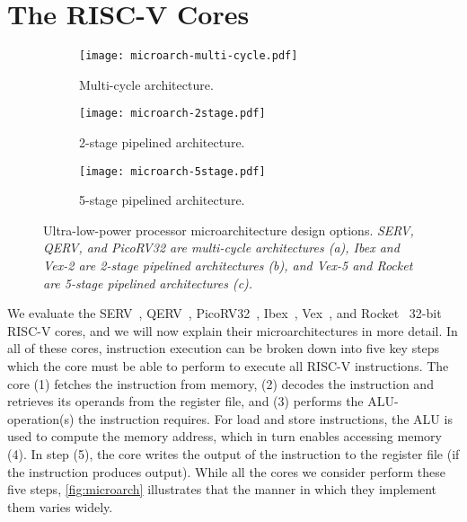 \section{The RISC-V Cores}
\label{sec:cores}

\begin{figure}[t]
    \centering
    \begin{subfigure}[b]{\columnwidth}
         \centering
         \texttt{[image: microarch-multi-cycle.pdf]}
         \caption{Multi-cycle architecture.}
         \label{fig:microarch-multi-cycle}
     \end{subfigure}
     
     \begin{subfigure}[b]{0.70\columnwidth}
         \centering
         \texttt{[image: microarch-2stage.pdf]}
         \caption{2-stage pipelined architecture.}
         \label{fig:microarch-two-stage}
     \end{subfigure}
     
     \begin{subfigure}[b]{0.8\columnwidth}
         \centering
         \texttt{[image: microarch-5stage.pdf]}
         \caption{5-stage pipelined architecture.}
         \label{fig:microarch-five-stage}
     \end{subfigure}
    
    \caption{Ultra-low-power processor microarchitecture design options. {\it SERV, QERV, and PicoRV32 are multi-cycle architectures (a),  Ibex and Vex-2 are 2-stage pipelined architectures (b), and Vex-5 and Rocket are 5-stage pipelined architectures (c).}}
    \label{fig:microarch}
\end{figure}

We evaluate the SERV~\cite{serv:GITHUB}, QERV~\cite{serv:GITHUB}, PicoRV32~\cite{picorv32:GITHUB}, Ibex~\cite{ibex:GITHUB}, Vex~\cite{vexriscv:GITHUB}, and Rocket~\cite{rocket} 32-bit RISC-V cores, and we will now explain their microarchitectures in more detail. In all of these cores, instruction execution can be broken down into five key steps which the core must be able to perform to execute all RISC-V instructions. The core (1) fetches the instruction from memory, (2) decodes the instruction and retrieves its operands from the register file, and (3) performs the ALU-operation(s) the instruction requires. For load and store instructions, the ALU is used to compute the memory address, which in turn enables accessing memory (4).
In step (5), the core writes the output of the instruction to the register file (if the instruction produces output).
While all the cores we consider perform these five steps, \autoref{fig:microarch} illustrates that the manner in which they implement them varies widely. 

